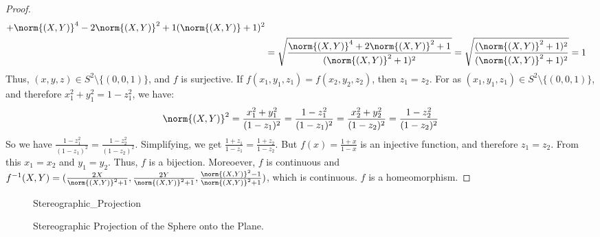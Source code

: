\documentclass[crop=false,class=book,oneside]{standalone}
\begin{document}
\begin{proof}
\begin{align*}
{{                            +\norm{(X,Y)}^{4}
                            -2\norm{(X,Y)}^{2}+1}
                        {(\norm{(X,Y)}+1)^{2}}
                    }\\
                    &=\sqrt{
                        \frac{\norm{(X,Y)}^{4}+2\norm{(X,Y)}^{2}+1}
                        {(\norm{(X,Y)}^{2}+1)^{2}}
                    }
                    =\sqrt{
                        \frac{(\norm{(X,Y)}^{2}+1)^{2}}
                        {(\norm{(X,Y)}^{2}+1)^{2}}
                    }
                    =1
                \end{align*}
                Thus, $(x,y,z)\in S^{2}\setminus\{(0,0,1)\}$,
                and $f$ is surjective.
                If $f(x_{1},y_{1},z_{1})=f(x_{2},y_{2},z_{2})$,
                then $z_{1}=z_{2}$.
                For as
                $(x_{1},y_{1},z_{1})\in S^{2}\setminus\{(0,0,1)\}$,
                and therefore
                $x_{1}^{2}+y_{1}^{2}=1-z_{1}^{2}$, we have:
                \begin{equation*}
                    \norm{(X,Y)}^{2}
                    =\frac{x_{1}^2+y_{1}^2}{(1-z_{1})^{2}}
                    =\frac{1-z_{1}^{2}}{(1-z_{1})^{2}}
                    =\frac{x_{2}^{2}+y_{2}^{2}}{(1-z_{2})^{2}}
                    =\frac{1-z_{2}^{2}}{(1-z_{2})^{2}}
                \end{equation*}
                So we have
                $\frac{1-z_{1}^{2}}{(1-z_{1})^{2}}%
                 =\frac{1-z_{2}^{2}}{(1-z_{2})^{2}}$.
                Simplifying, we get
                $\frac{1+z_{1}}{1-z_{1}}=\frac{1+z_{2}}{1-z_{2}}$.
                But $f(x)=\frac{1+x}{1-x}$ is an injective function,
                and therefore $z_{1}=z_{2}$.
                From this $x_{1}=x_{2}$ and $y_{1}=y_{2}$.
                Thus, $f$ is a bijection. Moreoever,
                $f$ is continuous and $f^{-1}(X,Y)%
                 =(\frac{2X}{\norm{(X,Y)}^{2}+1},%
                   \frac{2Y}{\norm{(X,Y)}^{2}+1},%
                   \frac{\norm{(X,Y)}^{2}-1}{\norm{(X,Y)}^{2}+1})$,
                which is continuous. $f$ is a homeomorphism.
            \end{proof}
            \begin{figure}[H]
                \captionsetup{type=figure}
                \centering
                {Stereographic_Projection}
                \caption{Stereographic Projection of the
                         Sphere onto the Plane.}
                \label{fig:surgery_theory_stereographic_%
                       projection_of_sphere_to_plane_homeomorphism}
            \end{figure}
\end{document}
